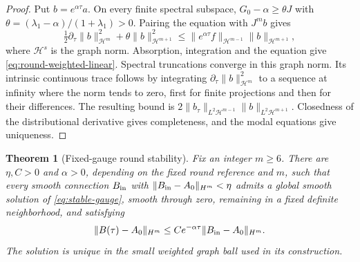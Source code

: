 \documentclass[11pt]{article}
\numberwithin{equation}{section}
\newtheorem{theorem}{Theorem}[section]
\theoremstyle{definition}
\theoremstyle{remark}
\begin{document}
\begin{proof}
Put $b=e^{\alpha\tau}a$. On every finite spectral subspace,
$G_0-\alpha\ge\theta J$ with
$\theta=(\lambda_1-\alpha)/(1+\lambda_1)>0$.
Pairing the equation with $J^mb$ gives
\[
 \tfrac12\partial_\tau\|b\|_{\mathcal H^m}^2
 +\theta\|b\|_{\mathcal H^{m+1}}^2
 \le \|e^{\alpha\tau}f\|_{\mathcal H^{m-1}}
                  \|b\|_{\mathcal H^{m+1}},
\]
where $\mathcal H^s$ is the graph norm.
Absorption, integration and the equation give
\eqref{eq:round-weighted-linear}. Spectral truncations
converge in this graph norm. Its intrinsic continuous trace
follows by integrating
$\partial_\tau\|b\|_{\mathcal H^m}^2$ to a sequence at
infinity where the norm tends to zero, first for finite
projections and then for their differences. The resulting
bound is $2\|b_\tau\|_{L^2\mathcal H^{m-1}}
\|b\|_{L^2\mathcal H^{m+1}}$.
Closedness of the distributional derivative gives
completeness, and the modal equations give uniqueness.
\end{proof}

\begin{theorem}[Fixed-gauge round stability]\label{thm:round-stability}
Fix an integer $m\ge6$. There are $\eta,C>0$ and
$\alpha>0$, depending on the fixed round reference and
$m$, such that every smooth connection $B_{\rm in}$ with
$\|B_{\rm in}-A_0\|_{H^m}<\eta$ admits a global smooth
solution of \eqref{eq:stable-gauge}, smooth through zero,
remaining in a fixed definite neighborhood, and satisfying
\[
 \|B(\tau)-A_0\|_{H^m}
 \le Ce^{-\alpha\tau}\|B_{\rm in}-A_0\|_{H^m}.
\]
The solution is unique in the small weighted graph ball
used in its construction.
\end{theorem}
\end{document}
